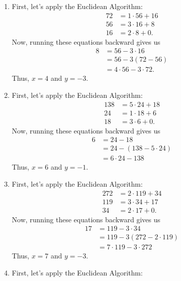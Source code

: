 \begin{solution}
    \begin{enumerate}
        \item First, let's apply the Euclidean Algorithm:
        \begin{align*}
            72 &= 1\cdot 56 + 16 \\
            56 &= 3\cdot 16 + 8 \\
            16 &= 2 \cdot 8 + 0.
        \end{align*}
        Now, running these equations backward gives us 
        \begin{align*}
            8 &= 56 - 3 \cdot 16 \\
            &= 56 - 3(72 - 56) \\
            &= 4 \cdot 56 - 3 \cdot 72.
        \end{align*}
        Thus, $x = 4$ and $y = -3$.
        \item First, let's apply the Euclidean Algorithm:
        \begin{align*}
            138 &= 5\cdot 24 + 18 \\
            24 &= 1\cdot 18 + 6 \\
            18 &= 3 \cdot 6 + 0.
        \end{align*}
        Now, running these equations backward gives us 
        \begin{align*}
            6 &= 24 - 18 \\
            &= 24 - (138 - 5 \cdot 24) \\
            &= 6\cdot 24 - 138
        \end{align*}
        Thus, $x = 6$ and $y = -1$.
        \item First, let's apply the Euclidean Algorithm:
        \begin{align*}
            272 &= 2\cdot 119 + 34 \\
            119 &= 3\cdot 34 + 17 \\
            34 &= 2 \cdot 17 + 0.
        \end{align*}
        Now, running these equations backward gives us 
        \begin{align*}
            17 &= 119 - 3\cdot 34 \\
            &= 119 - 3(272 - 2\cdot 119) \\
            &= 7\cdot 119 - 3\cdot 272
        \end{align*}
        Thus, $x = 7$ and $y = -3$.
        \item First, let's apply the Euclidean Algorithm:

\end{enumerate}
\end{solution}

